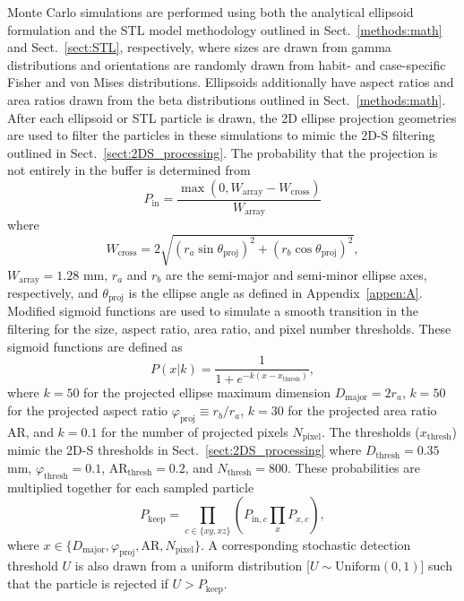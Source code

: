 \documentclass[amt, manuscript]{copernicus}
\begin{document}
Monte Carlo simulations are performed using both the analytical ellipsoid formulation and the STL model methodology outlined in Sect.~\ref{methods:math} and Sect.~\ref{sect:STL}, respectively, where sizes are drawn from gamma distributions and orientations are randomly drawn from habit- and case-specific Fisher and von Mises distributions. Ellipsoids additionally have aspect ratios and area ratios drawn from the beta distributions outlined in Sect.~\ref{methods:math}. After each ellipsoid or STL particle is drawn, the 2D ellipse projection geometries are used to filter the particles in these simulations to mimic the 2D-S filtering outlined in Sect.~\ref{sect:2DS_processing}. The probability that the projection is not entirely in the buffer is determined from
\begin{equation}
P_{\mathrm{in}} = \frac{\max\left(0,W_{\mathrm{array}}-W_{\mathrm{cross}}\right)}{W_{\mathrm{array}}}
\end{equation}
where
\begin{equation}\label{W_cross}
W_{\mathrm{cross}} = 2 \sqrt{\left( r_{a} \sin \theta_{\mathrm{proj}} \right)^{2} + (r_{b} \cos \theta_{\mathrm{proj}})^{2}},
\end{equation}
$W_{\mathrm{array}}=1.28$ mm, $r_{a}$ and $r_{b}$ are the semi-major and semi-minor ellipse axes, respectively, and $\theta_{\mathrm{proj}}$ is the ellipse angle as defined in Appendix~\ref{appen:A}. Modified sigmoid functions are used to simulate a smooth transition in the filtering for the size, aspect ratio, area ratio, and pixel number thresholds. These sigmoid functions are defined as
\begin{equation}
P({x|k}) = \frac{1}{1+e^{-k \left( x-x_{\mathrm{thresh}} \right)}},
\end{equation}
where $k=50$ for the projected ellipse maximum dimension $D_{\mathrm{major}} = 2 r_{a}$, $k=50$ for the projected aspect ratio $\varphi_{\mathrm{proj}}\equiv r_{b}/r_{a}$, $k=30$ for the projected area ratio AR, and $k=0.1$ for the number of projected pixels $N_{\mathrm{pixel}}$. The thresholds ($x_{\mathrm{thresh}}$) mimic the 2D-S thresholds in Sect.~\ref{sect:2DS_processing} where $D_{\mathrm{thresh}}=0.35$ mm, $\varphi_{\mathrm{thresh}}=0.1$, $\mathrm{AR}_{\mathrm{thresh}}=0.2$, and $N_{\mathrm{thresh}}=800$. These probabilities are multiplied together for each sampled particle
\begin{equation}
P_{\mathrm{keep}} = \prod_{c \in \{xy, xz\}} \left(P_{\mathrm{in},c} \prod_{x} P_{x,c}\right),
\end{equation}
where $x \in \{D_{\mathrm{major}}, \varphi_{\mathrm{proj}},\mathrm{AR},N_{\mathrm{pixel}}\}$. A corresponding stochastic detection threshold $U$ is also drawn from a uniform distribution [$U \sim \mathrm{Uniform}(0,1)$] such that the particle is rejected if $U > P_{\mathrm{keep}}$. 
\end{document}
